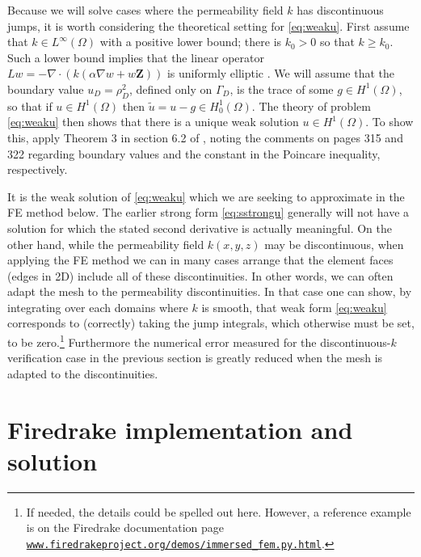 \documentclass[11pt]{amsart}
\newcommand{\bZ}{\mathbf{Z}}
\newcommand{\cT}{\mathcal{T}}
\newcommand{\Div}{\nabla\cdot}
\newcommand{\grad}{\nabla}
\begin{document}
Because we will solve cases where the permeability field $k$ has discontinuous jumps, it is worth considering the theoretical setting for \eqref{eq:weaku}.  First assume that $k\in L^\infty(\Omega)$ with a positive lower bound; there is $k_0>0$ so that $k \ge k_0$.  Such a lower bound implies that the linear operator $L w = - \Div(k \left(\alpha\grad w + w\bZ\right))$ is uniformly elliptic \citep[section 6.1]{Evans2010}.  We will assume that the boundary value $u_D = \rho_D^2$, defined only on $\Gamma_D$, is the trace of some $g\in H^1(\Omega)$, so that if $u\in H^1(\Omega)$ then $\tilde u = u - g \in H_0^1(\Omega)$.  The theory of problem \eqref{eq:weaku} then shows that there is a unique weak solution $u\in H^1(\Omega)$.  To show this, apply Theorem 3 in section 6.2 of \citep{Evans2010}, noting the comments on pages 315 and 322 regarding boundary values and the constant in the Poincare inequality, respectively.

It is the weak solution of \eqref{eq:weaku} which we are seeking to approximate in the FE method below.  The earlier strong form \eqref{eq:sstrongu} generally will not have a solution for which the stated second derivative is actually meaningful.  On the other hand, while the permeability field $k(x,y,z)$ may be discontinuous, when applying the FE method we can in many cases arrange that the element faces (edges in 2D) include all of these discontinuities.  In other words, we can often adapt the mesh to the permeability discontinuities.  In that case one can show, by integrating over each domains where $k$ is smooth, that weak form \eqref{eq:weaku} corresponds to (correctly) taking the jump integrals, which otherwise must be set, to be zero.\footnote{If needed, the details could be spelled out here.  However, a reference example is on the Firedrake documentation page \href{https://www.firedrakeproject.org/demos/immersed_fem.py.html}{\texttt{www.firedrakeproject.org/demos/immersed\_fem.py.html}}.}  Furthermore the numerical error measured for the discontinuous-$k$ verification case in the previous section is greatly reduced when the mesh is adapted to the discontinuities.



\section{Firedrake implementation and solution}
\end{document}
